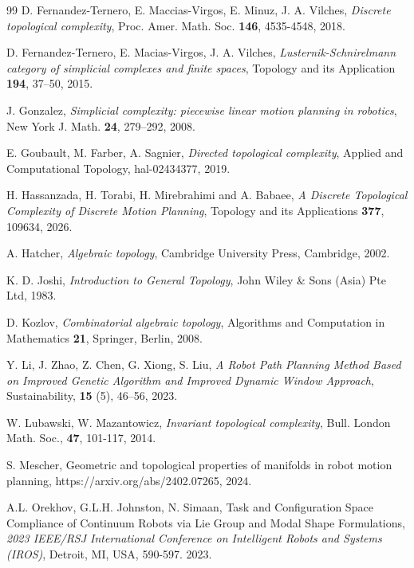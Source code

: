 \documentclass[preprint,11pt %
]{hjm1}
\theoremstyle{definition}
\begin{document}
\begin{thebibliography}{99}
D. Fernandez-Ternero, E. Maccias-Virgos, E. Minuz,  J. A. Vilches, \textit{Discrete topological complexity}, Proc. Amer. Math. Soc. {\bf 146}, 4535-4548, 2018.


D. Fernandez-Ternero, E. Macias-Virgos, J. A. Vilches, \textit{Lusternik-Schnirelmann category of simplicial complexes and finite spaces}, Topology and its Application {\bf 194}, 37--50, 2015.





J. Gonzalez, \textit{Simplicial complexity: piecewise linear motion planning in robotics}, New York J. Math. {\bf 24}, 279--292, 2008.

E. Goubault, M. Farber, A. Sagnier, \textit{Directed topological complexity}, Applied and Computational Topology, hal-02434377, 2019.

H. Hassanzada, H. Torabi, H. Mirebrahimi and A. Babaee, 
\textit{A Discrete Topological Complexity of Discrete Motion Planning}, Topology and its Applications {\bf 377},
 109634, 2026.




A. Hatcher, \textit{Algebraic topology}, Cambridge University Press, Cambridge, 2002. 

K. D. Joshi, \textit{Introduction to General Topology}, John Wiley \& Sons (Asia) Pte Ltd, 1983. 

D. Kozlov, \textit{Combinatorial algebraic topology}, Algorithms and Computation in Mathematics {\bf 21}, Springer, Berlin, 2008.

Y. Li, J. Zhao, Z.  Chen, G. Xiong, S. Liu, {\it A Robot Path Planning Method Based on Improved Genetic Algorithm and Improved Dynamic Window Approach}, {Sustainability}, {\bf 15} (5), 46--56, 2023. 


W. Lubawski, W. Mazantowicz, \textit{Invariant topological complexity}, Bull. London Math. Soc., {\bf 47}, 101-117, 2014.


S. Mescher, Geometric and topological properties of manifolds in robot motion planning, https://arxiv.org/abs/2402.07265, 2024.

A.L. Orekhov, G.L.H. Johnston, N. Simaan, Task and Configuration Space Compliance of Continuum Robots via Lie Group and Modal Shape Formulations, \textit{2023 IEEE/RSJ International Conference on Intelligent Robots and Systems (IROS)}, Detroit, MI, USA, 590-597. 2023.



\end{thebibliography}
\end{document}
